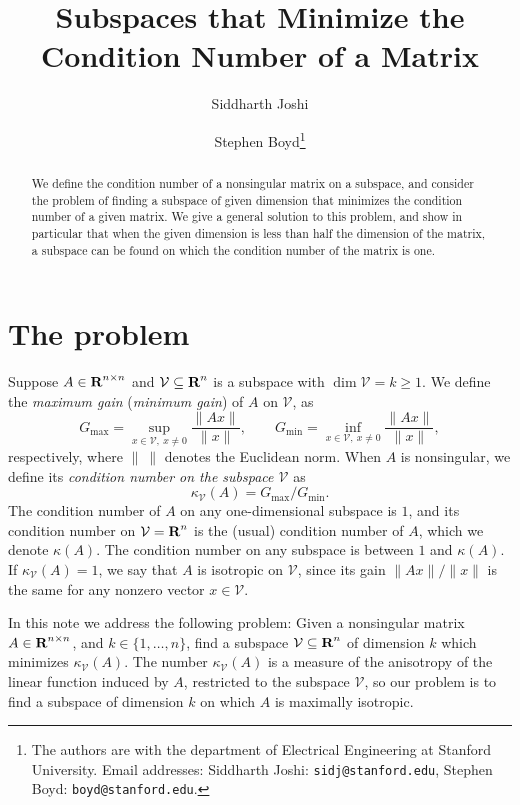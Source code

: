 \documentclass[12pt]{article}
\title{Subspaces that Minimize the Condition Number of a Matrix}
\author{Siddharth Joshi \and Stephen Boyd\thanks{The authors are with the department of
Electrical Engineering at Stanford University. Email addresses: Siddharth
Joshi: \texttt{sidj@stanford.edu}, Stephen Boyd:
\texttt{boyd@stanford.edu}.}}
\date{}
\newcommand{\reals}{{\mbox{\bf R}}}%
\begin{document}
\maketitle
\thispagestyle{empty}


\begin{abstract}
We define the condition number of a nonsingular matrix on a
subspace, and consider the problem of finding
a subspace of given dimension that minimizes the condition
number of a given matrix.
We give a general solution to this problem, and show in particular
that when the given dimension is less than half the dimension
of the matrix, a subspace can be found on which the condition
number of the matrix is one.
\end{abstract}


\section{The problem} 

Suppose $A\in \reals^{n \times n}$ and
$\mathcal V \subseteq \reals^n$ is a subspace with $\dim \mathcal
V = k \geq 1$. 
We define the \emph{maximum gain} (\emph{minimum gain})
of $A$ on $\mathcal V$, as
\[
G_\mathrm{max} =
\sup_{x \in \mathcal V,~x \neq 0} \frac{\|Ax\|}{\|x\|}, \qquad
G_\mathrm{min} =
\inf_{x \in \mathcal V,~x \neq 0} \frac{\|Ax\|}{\|x\|},
\]
respectively, where $\|~\|$ denotes the Euclidean norm.
When $A$ is nonsingular, we define its \emph{condition number
on the subspace $\mathcal V$} as
\[
\kappa_{\mathcal V}(A) = G_\mathrm{max}/G_\mathrm{min}.
\]
The condition number of $A$ on any
one-dimensional subspace is $1$, and its condition number
on $\mathcal V=\reals^n$ is the (usual) condition number of $A$,
which we denote $\kappa(A)$.
The condition number on any subspace is between $1$ and $\kappa(A)$.
If $\kappa_{\mathcal V}(A)=1$, we say that $A$ is isotropic 
on $\mathcal V$,
since its gain $\|Ax\|/\|x\|$ is the same for any nonzero vector
$x \in \mathcal V$.

In this note we address the following problem:
Given a nonsingular matrix $A \in \reals^{n \times n}$, and 
$k \in \{1,\ldots, n\}$, find a subspace $\mathcal V \subseteq \reals^n$
of dimension $k$ which minimizes $\kappa_{\mathcal V}(A)$.
The number $\kappa_{\mathcal V}(A)$ is a measure of the
anisotropy of the linear function induced by $A$, restricted
to the subspace $\mathcal V$, so
our problem is to find a subspace of dimension $k$
on which $A$ is maximally isotropic. 
\end{document}

